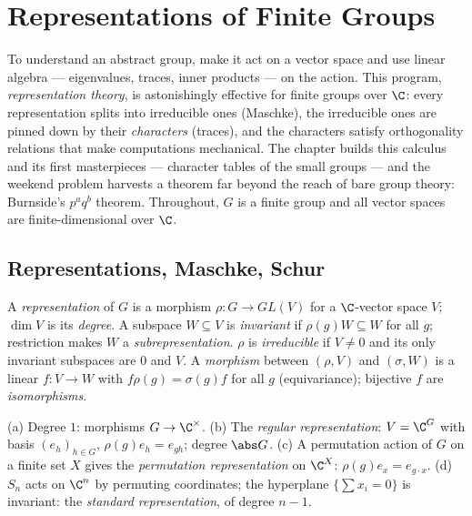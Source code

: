 \chapter{Representations of Finite Groups}\label{ch:b3:representations}

To understand an abstract group, make it act on a vector space
and use linear algebra --- eigenvalues, traces, inner products ---
on the action. This program, \emph{representation theory}, is
astonishingly effective for finite groups over $\C$: every
representation splits into irreducible ones (Maschke), the
irreducible ones are pinned down by their \emph{characters}
(traces), and the characters satisfy orthogonality relations that
make computations mechanical. The chapter builds this calculus
and its first masterpieces --- character tables of the small
groups --- and the weekend problem harvests a theorem far beyond
the reach of bare group theory: Burnside's $p^aq^b$ theorem.
Throughout, $G$ is a finite group and all vector spaces are
finite-dimensional over $\C$.

\section{Representations, Maschke, Schur}

\begin{definition}\label{def:b3:representations:rep}
A \emph{representation} of $G$ is a
morphism $\rho \colon G \to GL(V)$ for a $\C$-vector space $V$;
$\dim V$ is its \emph{degree}. A subspace $W \subseteq V$ is
\emph{invariant} if $\rho(g)W \subseteq W$ for all $g$;
restriction makes $W$ a \emph{subrepresentation}. $\rho$ is
\emph{irreducible} if $V \neq
0$ and its only invariant subspaces are $0$ and $V$. A
\emph{morphism} between $(\rho, V)$ and $(\sigma, W)$ is a linear
$f\colon V \to W$ with $f\rho(g) = \sigma(g)f$ for all $g$
(equivariance); bijective $f$ are \emph{isomorphisms}.
\end{definition}

\begin{example}\label{ex:b3:representations:examples}
(a) Degree $1$: morphisms $G \to \C^\times$.
(b) The \emph{regular representation}: $V = \C^G$ with basis $(e_h)_{h \in G}$,
$\rho(g)e_h = e_{gh}$; degree $\abs G$.
(c) A permutation action of $G$ on a finite set $X$ gives the
\emph{permutation representation} on $\C^X$: $\rho(g)e_x =
e_{g\cdot x}$.
(d) $S_n$ acts on $\C^n$ by permuting coordinates; the hyperplane
$\{\sum x_i = 0\}$ is invariant: the \emph{standard
representation}, of degree $n - 1$.
\end{example}

